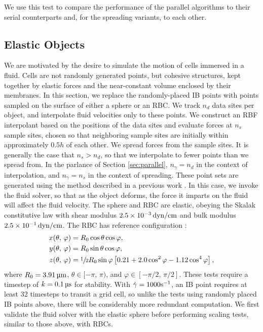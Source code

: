 We use this test to compare the performance of the parallel algorithms to their serial
counterparts and, for the spreading variants, to each other.





\subsection{Elastic Objects}

We are motivated by the desire to simulate the motion of cells immersed in a fluid. Cells
are not randomly generated points, but cohesive structures, kept together by elastic
forces and the near-constant volume enclosed by their membranes. In this section, we
replace the randomly-placed IB points with points sampled on the surface of either a
sphere or an RBC. We track $n_d$ data sites per object, and interpolate fluid velocities
only to these points. We construct an RBF interpolant based on the positions of the data
sites and evaluate forces at $n_s$ sample sites, chosen so that neighboring sample sites
are initially within approximately $0.5h$ of each other. We spread forces from the sample
sites. It is generally the case that $n_s > n_d$, so that we interpolate to fewer points
than we spread from. In the parlance of Section \ref{sec:parallel}, $n_\gamma=n_d$ in the
context of interpolation, and $n_\gamma=n_s$ in the context of spreading. These point
sets are generated using the method described in a previous work \cite{Shankar:2018ur}.
In this case, we invoke the fluid solver, so that as the object deforms, the force it
imparts on the fluid will affect the fluid velocity. The sphere and RBC are elastic,
obeying the Skalak constitutive law \cite{Skalak:1973tp} with shear modulus
$2.5\times10^{-3}\dynpercm$ and bulk modulus $2.5\times10^{-1}\dynpercm$. The RBC has
reference configuration \cite{Omori:2012hw}:
\begin{equation}
    \begin{aligned}
        x(\theta,\,\varphi) &= R_0\cos\theta\cos\varphi, \\
        y(\theta,\,\varphi) &= R_0\sin\theta\cos\varphi, \\
        z(\theta,\,\varphi) &= \sfrac12 R_0\sin\varphi\left[0.21 + 2.0 \cos^2\varphi -1.12 \cos^4\varphi\right],
    \end{aligned}
\end{equation}
where $R_0=3.91\um$, $\theta\in[-\pi,\,\pi)$, and $\varphi\in[-\pi/2,\,\pi/2]$. These
tests require a timestep of $k=0.1\us$ for stability. With $\dot{\gamma}=1000\si{\per\second}$,
an IB point requires at least 32 timesteps to transit a grid cell, so unlike the tests
using randomly placed IB points above, there will be considerably more redundant
computation. We first validate the fluid solver with the elastic sphere before performing
scaling tests, similar to those above, with RBCs.





